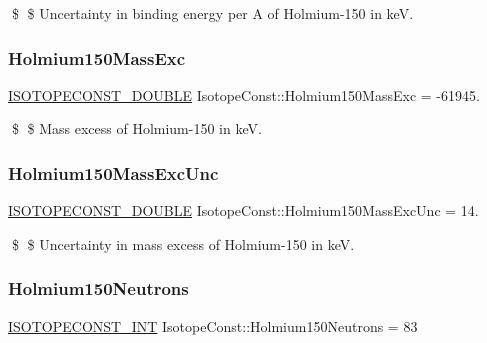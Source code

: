 \$ \$ Uncertainty in binding energy per A of Holmium-\/150 in keV. \mbox{\label{group___isotope_const-_holmium-_ho150_ga2f7fb5ce361d00ca25ff3b167832b147}} 
\subsubsection{\texorpdfstring{Holmium150\+Mass\+Exc}{Holmium150MassExc}}
{\footnotesize\ttfamily \mbox{\hyperlink{group___isotope_const-_macros_ga8f45a7272ce02c0b4c65c44636ed719a}{I\+S\+O\+T\+O\+P\+E\+C\+O\+N\+S\+T\+\_\+\+D\+O\+U\+B\+LE}} Isotope\+Const\+::\+Holmium150\+Mass\+Exc = -\/61945.}

\$ \$ Mass excess of Holmium-\/150 in keV. \mbox{\label{group___isotope_const-_holmium-_ho150_ga4183c690a5cbc68a898e16e70f522afe}} 
\subsubsection{\texorpdfstring{Holmium150\+Mass\+Exc\+Unc}{Holmium150MassExcUnc}}
{\footnotesize\ttfamily \mbox{\hyperlink{group___isotope_const-_macros_ga8f45a7272ce02c0b4c65c44636ed719a}{I\+S\+O\+T\+O\+P\+E\+C\+O\+N\+S\+T\+\_\+\+D\+O\+U\+B\+LE}} Isotope\+Const\+::\+Holmium150\+Mass\+Exc\+Unc = 14.}

\$ \$ Uncertainty in mass excess of Holmium-\/150 in keV. \mbox{\label{group___isotope_const-_holmium-_ho150_ga4b2d6423048aa505d630b1f1781c7dcd}} 
\subsubsection{\texorpdfstring{Holmium150\+Neutrons}{Holmium150Neutrons}}
{\footnotesize\ttfamily \mbox{\hyperlink{group___isotope_const-_macros_ga5f18360b3e99483a35c32d789e62621c}{I\+S\+O\+T\+O\+P\+E\+C\+O\+N\+S\+T\+\_\+\+I\+NT}} Isotope\+Const\+::\+Holmium150\+Neutrons = 83}

